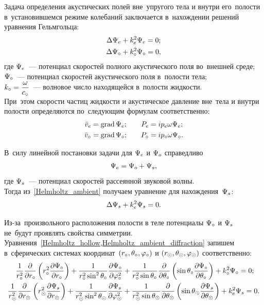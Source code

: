 Задача определения акустических полей вне~упругого тела и внутри его~полости в~установившемся режиме колебаний заключается в~нахождении решений уравнения Гельмгольца:
\begin{align}
\Lap\P\en &+ k\en^2\P\en = 0;\label{Helmholtz_ambient}\\
\Lap\P\c &+ k\c^2\P\c = 0,\label{Helmholtz_hollow}
\end{align}
где $\P\en$~--- потенциал скоростей полного акустического поля во~внешней среде;\\
$\P\c$~--- потенциал скоростей акустического поля в~полости тела;\\
$k\c = \df{\om}{c\c}$~--- волновое число находящейся в~полости жидкости.\\ При~этом скорости частиц жидкости и акустическое давление вне~тела и внутри полости определяются по~следующим формулам соответственно:
\begin{align}
\v\en &= \grad\P\en; &\q P\en &= ip\en\om\P\en;\label{eq_ven}\\
\v\c &= \grad\P\c; &\q P\c &= ip\c\om\P\c.\label{eq_vc}
\end{align}


В~силу линейной постановки задачи для $\P\en$ и $\P\o$ справедливо
\begin{equation} \label{potention_speed_ambient}
\P\en = \P\o + \P\sc,
\end{equation}
где $\P\sc$~--- потенциал скоростей рассеянной звуковой волны.\\
Тогда из~\eqref{Helmholtz_ambient} получаем уравнение для нахождения~$\P\sc$:
\begin{equation} \label{Helmholtz_ambient_diffraction}
\Lap\P\sc + k\en^2\P\sc = 0.
\end{equation}

Из-за~произвольного расположения полости в теле потенциалы $\P\c$ и $\P\sc$ не~будут проявлять свойства симметрии.
Уравнения~\cref{Helmholtz_hollow,Helmholtz_ambient_diffraction} запишем в~сферических системах координат~$(r\c, \Q\c, \f\c)$ и $(r\s, \Q\s, \f\s)$ соответственно:
\begin{align}
\fr1{r\c^2}\fr\de{\de r\c}\left(r\c^2 \fr{\de\P\c}{\de r\c}\right) + \fr1{r\c^2\sin^2\Q\c}\fr{\de\P\c}{\de\f\c^2} &+ \fr1{r\c^2\sin\Q\c}\fr\de{\de\Q\c} \left(\sin\Q\c \fr{\de\P\c}{\de\Q\c}\right) + k\c^2\P\c = 0;\\
\fr1{r\s^2}\fr\de{\de r\s}\left(r\s^2 \fr{\de\P\sc}{\de r\s}\right) + \fr1{r\s^2\sin^2\Q\s}\fr{\de\P\sc}{\de\f\s^2} &+ \fr1{r\s^2\sin\Q\s}\fr\de{\de\Q\s} \left(\sin\Q\s \fr{\de\P\sc}{\de\Q\s}\right) + k\en^2\P\sc = 0.
\end{align}

